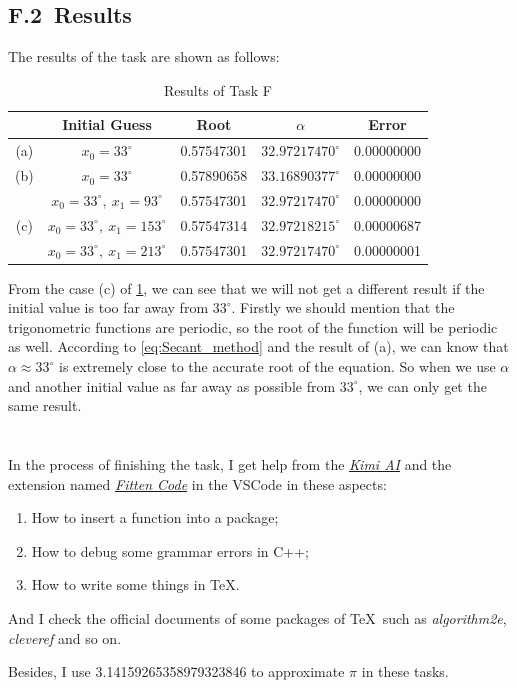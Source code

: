 \documentclass[a4paper]{article}
\begin{document}
\subsection*{F.2\ Results}

The results of the task are shown as follows:
\begin{table}[htbp]
  \centering
  \begin{tabular}{|c|c|c|c|c|}
    \hline
    & \textbf{Initial Guess} & \textbf{Root} & \textbf{$\alpha$} & \textbf{Error} \\
    \hline 
    (a) & $x_0 = 33^{\circ}$ & 0.57547301 & $32.97217470^{\circ}$ & 0.00000000 \\
    \hline 
    (b) & $x_0 = 33^{\circ}$ & 0.57890658 & $33.16890377^{\circ}$ & 0.00000000 \\
    \hline 
    \multirow{3}{*}{(c)} & $x_0 = 33^{\circ} ,\ x_1 = 93^{\circ}$ & 0.57547301 & $32.97217470^{\circ}$ & 0.00000000 \\
    \cline{2-5}
    & $x_0 = 33^{\circ} ,\ x_1 = 153^{\circ}$ & 0.57547314 & $32.97218215^{\circ}$ & 0.00000687 \\
    \cline{2-5}
    & $x_0 = 33^{\circ} ,\ x_1 = 213^{\circ}$ & 0.57547301 & $32.97217470^{\circ}$ & 0.00000001 \\
    \hline
  \end{tabular}
  \caption{Results of Task F}
  \label{tab:F}
\end{table}

From the case (c) of \cref{tab:F}, we can see that we will not get a different result if the initial value is too far away from $33^{\circ}$. 
Firstly we should mention that the trigonometric functions are periodic, so the root of the function will be periodic as well. 
According to \cref{eq:Secant_method} and the result of (a), we can know that $\alpha \approx 33^{\circ}$ is extremely close to the accurate root of the equation. 
So when we use $\alpha$ and another initial value as far away as possible from $33^{\circ}$, we can only get the same result.

\section*{  }
In the process of finishing the task, I get help from the \href{https://kimi.moonshot.cn}{\textit{Kimi AI}} and the extension named \href{https://code.fittentech.com/tutor_vscode_en}{\textit{Fitten Code}} in the VSCode in these aspects:
\begin{enumerate}
  \item How to insert a function into a package;
  \item How to debug some grammar errors in C++;
  \item How to write some things in \TeX. 
\end{enumerate}

And I check the official documents of some packages of \TeX \ such as \textit{algorithm2e}, \textit{cleveref} and so on.

Besides, I use 3.14159265358979323846 to approximate $\pi$ in these tasks.

\printbibliography
\end{document}
